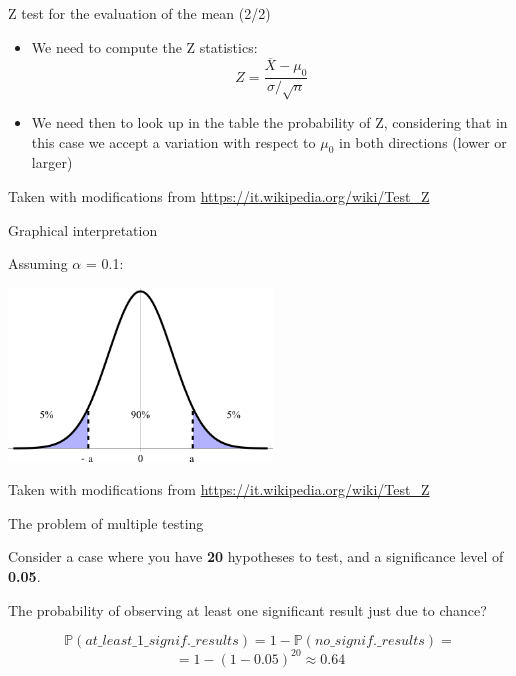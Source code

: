 \documentclass{beamer}
\begin{document}
\begin{frame}
{\centerline{Z test for the evaluation of the mean (2/2)}}

\begin{itemize}
\item We need to compute the Z statistics:
\[ Z={\frac {\overline {X}-\mu _{0}}{\sigma /{\sqrt {n}}}} \]
\item We need then to look up in the table the probability of Z, considering that in this case we accept a variation with respect to $\mu_0$ in both directions (lower or larger)
\end{itemize}


\begin{center}
\tiny{Taken with modifications from \url{https://it.wikipedia.org/wiki/Test_Z}}
\end{center}

\end{frame}

\begin{frame}
{\centerline{Graphical interpretation}}

Assuming $\alpha$ = 0.1:

\begin{center}
\includegraphics[width=70mm]{P2023.AIBCCSS.InferenceAndLogisticRegression/Confidence_Interval_90P.png}
\end{center}

\begin{center}
\tiny{Taken with modifications from \url{https://it.wikipedia.org/wiki/Test_Z}}
\end{center}

\end{frame}




\begin{frame}
{\centerline{The problem of multiple testing }}
Consider a case where you have \textbf{20} hypotheses to test, and a significance level of \textbf{0.05}. 
\newline

The probability of observing at least one significant result just due to chance?

$$\mathbb{P}(at\_least\_1\_signif.\_results) = 1 - \mathbb{P}(no\_signif.\_results) = $$
$$= 1 - (1-0.05)^{20} \approx 0.64$$


\end{frame}
\end{document}
